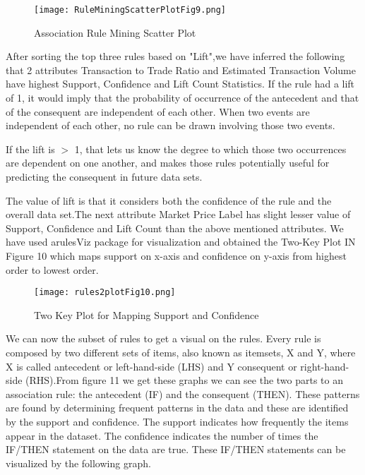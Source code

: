 \documentclass{article}
\begin{document}
\begin{figure}[h]
    \centering
    \texttt{[image: RuleMiningScatterPlotFig9.png]}
    \caption{ Association Rule Mining Scatter Plot }
    \label{fig:my_label}
\end{figure}


After sorting the top three rules based on "Lift",we have inferred the following that 2 attributes Transaction to Trade Ratio and  Estimated Transaction Volume have highest Support, Confidence and Lift Count Statistics. If the rule had a lift of 1, it would imply that the probability of occurrence of the antecedent and that of the consequent are independent of each other. When two events are independent of each other, no rule can be drawn involving those two events.\newline

If the lift is $>$ 1, that lets us know the degree to which those two occurrences are dependent on one another, and makes those rules potentially useful for predicting the consequent in future data sets. \newline

The value of lift is that it considers both the confidence of the rule and the overall data set.The next attribute Market Price Label has slight lesser value of Support, Confidence and Lift Count than the above mentioned attributes. We have used arulesViz package for visualization and obtained the Two-Key Plot IN Figure 10 which maps support on x-axis and confidence on y-axis from highest order to lowest order. 

\begin{figure}[h]
    \centering
    \texttt{[image: rules2plotFig10.png]}
    \caption{ Two Key Plot for Mapping Support and Confidence}
    \label{fig:my_label}
\end{figure}

 We can now the subset of rules to get a visual on the rules. Every rule is composed by two different sets of items, also known as itemsets,  X and Y, where X is called antecedent or left-hand-side (LHS) and Y consequent or right-hand-side (RHS).From figure 11 we get these graphs we can see the two parts to an association rule: the antecedent (IF) and the consequent (THEN).  These patterns are found by determining frequent patterns in the data and these are identified by the support and confidence.  The support indicates how frequently the items appear in the dataset. The confidence indicates the number of times the IF/THEN statement on the data are true. These IF/THEN statements can be visualized by the following graph. \newline
 
\end{document}
